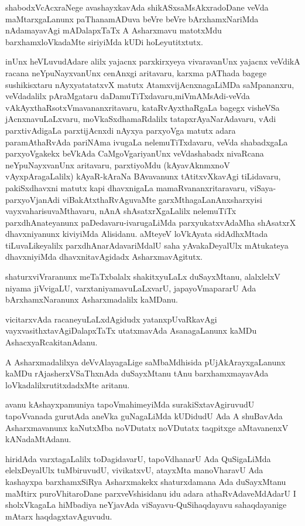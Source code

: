 shabodxVcAcxraNege avashayxkavAda shikASxsaMsAkxradoDane veVda maMtarxgaLanunx paThanamADuva beVre beVre bArxhamxNariMda nAdamayavAgi mADalapxTaTx A Asharxmavu matotxMdu barxhamxloVkadaMte siriyiMda kUDi hoLeyutitxtutx.

\newpage

inUnx heVLuvudAdare alilx yajacnx parxkirxyeya vivaravanUnx yajacnx veVdikA racana neYpuNayxvanUnx cenAnxgi aritavaru, karxma pAThada bagege sushikisxtaru nAyxya\-tatatxvX matutx AtamxvijAcnxnagaLiMDa saMpananxru, veVdadalilx pAraMgataru daDamuTiTxdavaru,\break miVmAMsAdi-veVda vAkAyxthaRsotxVmavananxritavaru, kataR\-vAyxthaRgaLa bagegx \hbox{visheVSa} jAcnxnavuLaLxvaru, moVkaSxdhamaRdalilx tatapxrAyaNarAdavaru, vAdi parxtivAdigaLa parxti\-jAcnxdi nAyxya parxyoVga matutx adara paramAthaRvAda pariNAma ivugaLa nele\-muTiTxdavaru, veVda shabadxgaLa parxyoVgakekx beVkAda CaMgoVgariyanUnx veVdashabadx nivaRcana neYpuNayxvanUnx aritavaru, parxti\-yoMdu (kAyavAknmxnoV vAyxpAra\-gaLalilx) kAyaR-kAraNa BAvavanunx tAtitxvXkavAgi tiLidavaru, pakiSx\-dhavxni matutx kapi dhavxni\-gaLa mamaRvananxritaravaru, viSaya-parxyoVjanAdi viBakAtxthaRvAguvaMte garxMtha\-gaLa\-nAnxsharxyisi vayxvaharisuvaMthavaru, nAnA shAsatxrXgaLalilx nelemuTiTx parxdhAnateyanunx paDe\-davaru-ivaru\-gaLiMda parxyukatxvAdaMha shAsatxrX dhavxniyanunx kiviyiMda Alisidanu. aMteyeV loVkAyata sidAdhxMtada tiLuvaLikeyalilx parxdhAnarAdavariMdalU saha yAvakaDeyalUlx mAtukateya dhavxniyiMda dhavxnitavAgidadx AsharxmavAgitutx.

shaturxviVraranunx meTaTxbalalx shakitxyuLaLx duSayxMtanu, alalxlelxV niyama jiVvigaLU, varxtaniyamavuLaLx\-varU, japayoVmapararU Ada bArxhamxNaranunx Asharxmadalilx kaMDanu.

vicitarxvAda racaneyuLaLxdAgidudx yatanxpUvaRkavAgi vayxvasithxtavAgiDalapxTaTx utatxmavAda AsanagaLanunx kaMDu AshacxyaRcakitanAdanu.

A Asharxmadalilxya deVvAlayagaLige saMbaMdhisida pUjAkArayxgaLanunx kaMDu rAjasherxVSaThxnAda duSayxM\-tanu tAnu barxhamxmayavAda loVkadalilxrutitxdadxMte aritanu.

avanu kAshayxpamuniya tapoVmahimeyiMda surakiSxtavAgiruvudU tapoV\-vanada gurutAda aneVka guNagaLiMda kUDidudU Ada A shuBavAda Asharxmavanunx kaNutxMba noVDutatx noVDutatx taqpitxge aMtavanenxV kANadaMtAdanu.

hiridAda varxtagaLalilx toDagidavarU, tapoVdhanarU Ada QuSigaLiMda elelxDeyalUlx tuMbiru\-vudU, vivikatxvU, atayxMta manoVharavU Ada kashayxpa barxhamxSiRya Asharxmakekx shaturxdamana Ada duSayxM\-tanu maMtirx puroVhitaroDane parxveVshisidanu idu adara athaRvAdaveMdAdarU I sholxVkagaLa hiMbadiya neYja\-vAda viSayavu-QuSihaqdayavu sahaqdayanige mAtarx haqdagxtavAguvudu.

